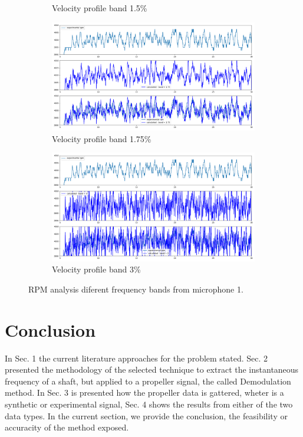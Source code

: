 \documentclass[10pt,fleqn,a4paper,twoside]{article}
\begin{document}
\begin{figure}
\begin{subfigure}{0.4\textwidth}
        \caption{Velocity profile band 1.5\%}
        \label{fig:sixth}
    \end{subfigure}
    \centering
    \hfill
    \begin{subfigure}{0.4\textwidth}
        \includegraphics[width=\textwidth]{Figures/rpm_analysis_mic0_band_1.75.png}
        \caption{Velocity profile band 1.75\%}
        \label{fig:seventh}
    \end{subfigure}
    \centering
    \hfill 
    \begin{subfigure}{0.4\textwidth}
        \includegraphics[width=\textwidth]{Figures/rpm_analysis_mic0_band_3.png}
        \caption{Velocity profile band 3\%}
        \label{fig:eigth}
    \end{subfigure}
            
    \caption{RPM analysis diferent frequency bands from microphone 1.}
    \label{fig:figures}
    \end{figure}

\section{Conclusion}
In Sec. 1 the current literature approaches for the problem stated. Sec. 2 presented the methodology of the selected technique to extract the instantaneous frequency of a shaft, but applied to a propeller signal, the called Demodulation method. In Sec. 3 is presented how the propeller data is gattered, wheter is a synthetic or experimental signal, Sec. 4 shows the results from either of the two data types. In the current section, we provide the conclusion, the feasibility or accuracity of the method exposed.
\end{document}

